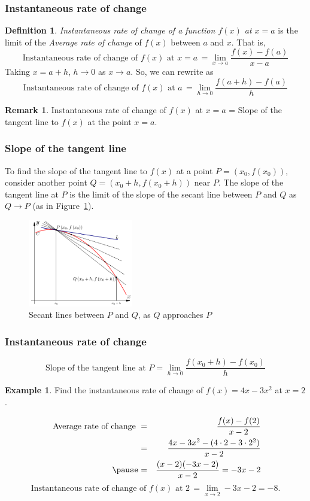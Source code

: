 \documentclass[t]{beamer}
\theoremstyle{plain}
\theoremstyle{definition}
\newtheorem{dfn}{Definition}
\newtheorem{rem}[prop]{Remark}
\newtheorem{ex}{Example}[section]
\newcommand{\nin}{\noindent}
\begin{document}
\frame
{
\frametitle{Instantaneous rate of change}
\begin{dfn}
{\em Instantaneous rate of change of a function $f(x)$ at $x=a$} is the limit of the {\em Average rate of change} of $f(x)$ between $a$ and $x$.  \pause
That is, \[ \text{Instantaneous rate of change of }f(x)\text{ at }x=a\,=\lim_{x\to a}\frac{f(x)-f(a)}{x-a}\]\pause
Taking $x=a+h$, $h\to 0$ as $x\to a$. So, we can rewrite as 
\[ \text{Instantaneous rate of change of }f(x)\text{ at }a\,=\lim_{h\to 0}\frac{f(a+h)-f(a)}{h}\]
\end{dfn}\pause
\begin{rem}
Instantaneous rate of change of $f(x)$ at $x=a$ = Slope of the tangent line to $f(x)$ at the point $x=a$.
\end{rem}
}

\frame
{
\frametitle{Slope of the tangent line}
To find the slope of the tangent line to $f(x)$ at a point $P=(x_0,f(x_0))$, consider another point $Q=(x_0+h,f(x_0+h))$ near $P$. \pause The slope of the tangent line at $P$ is the limit of the slope of the secant line between $P$ and $Q$ as $Q\to P$ (as in Figure~\ref{fig:4}).\pause

\begin{figure}[h] %
     \centering
     \includegraphics[width=1.8in]{Tangent_as_Secant_Limit.png}
     \caption{Secant lines between $P$ and $Q$, as $Q$ approaches $P$}
     \label{fig:4}
  \end{figure}
  }
  
\frame
{
\frametitle{Instantaneous rate of change}
\[ \text{Slope of the tangent line at }P = \lim_{h\to 0}\frac{f(x_0+h)-f(x_0)}{h}\]\pause
\begin{ex}
Find the instantaneous rate of change of $f(x)=4x-3x^2$ at $x=2$.\pause

\nin {\bf Solution:}\vspace*{-5mm}  \begin{eqnarray*}
\text{ Average rate of change }&=& \frac{f(x)-f(2)}{x-2} \\ 
&=& \frac{4x-3x^2-(4\cdot 2-3\cdot 2^2)}{x-2}\\ \pause
&=& \frac{(x-2)(-3x-2)}{x-2} = -3x-2
\end{eqnarray*}\pause
\vspace*{-4mm} \[\text{Instantaneous rate of change of }f(x)\text{ at }2\,=\lim_{x\to 2}-3x-2=-8.\]
\end{ex}
}
\end{document}
